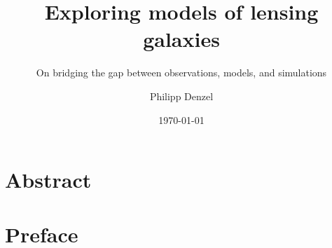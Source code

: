 \documentclass[
    fontsize=10pt,
    twoside=true,
    numbers=noenddot,
]{cls/phdbyphd}
\begin{document}
% 

\titlehead{Doctoral Dissertation}

\subject{Doctoral Dissertation}
\title[Exploring models of lensing galaxies]{
    Exploring models of lensing galaxies
}
\subtitle{On bridging the gap between observations, models, and simulations}

\author[Philipp Denzel]{Philipp Denzel}
\date{\today}
\publishers{University of Z\"urich}

\frontmatter
{}

\dedication{
	For the one who will never read it.\\
	\flushright -- Philipp Denzel
}

\maketitle


\chapter*{Abstract}
    

\chapter*{Preface}
    

\begingroup

    \setlength{\textheight}{23cm}
    \etocstandarddisplaystyle
    \etocstandardlines

    \tableofcontents

    \listoffigures
\end{document}
